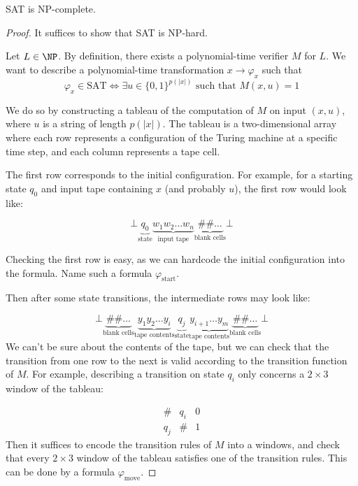 \begin{theorem}
	SAT is NP-complete.
\end{theorem}
\begin{proof}
	It suffices to show that SAT is NP-hard.

	Let $L\in \NP$. By definition, there exists a polynomial-time verifier $M$ for $L$. We want to describe a polynomial-time transformation $x\to \varphi_x$ such that
	\[
		\varphi_x \in \text{SAT} \iff \exists u \in \{0,1\}^{p(|x|)} \text{ such that } M(x,u) = 1\]

	We do so by constructing a tableau of the computation of $M$ on input $(x,u)$, where $u$ is a string of length $p(|x|)$.
	The tableau is a two-dimensional array where each row represents a configuration of the Turing machine at a specific time step, and each column represents a tape cell.

	The first row corresponds to the initial configuration. For example, for a starting state $q_0$ and input tape containing $x$ (and probably $u$), the first row would look like:

	\[
		\bot \underbrace{q_0}_{\text{state}} \underbrace{w_1 w_2 \ldots w_n}_{\text{input tape}} \underbrace{\# \# \ldots}_{\text{blank cells}}\bot
	\]

	Checking the first row is easy, as we can hardcode the initial configuration into the formula. Name such a formula $\varphi_{\text{start}}$.

	Then after some state transitions, the intermediate rows may look like:

	\[
		\bot \underbrace{\# \# \ldots}_{\text{blank cells}} \underbrace{y_1 y_2 \ldots y_i}_{\text{tape contents}} \underbrace{q_j}_{\text{state}} \underbrace{y_{i+1}\ldots y_m}_{\text{tape contents}} \underbrace{\# \# \ldots}_{\text{blank cells}}\bot
	\]
	We can't be sure about the contents of the tape, but we can check that the transition from one row to the next is valid according to the transition function of $M$. For example, describing a transition on state $q_i$ only concerns a $2 \times 3$ window of the tableau:

	\[
		\begin{array}{ccc}
			\#  & q_i & 0 \\
			q_j & \#  & 1
		\end{array}
	\]
	Then it suffices to encode the transition rules of $M$ into a windows, and check that every $2 \times 3$ window of the tableau satisfies one of the transition rules. This can be done by a formula $\varphi_{\text{move}}$.


\end{proof}
